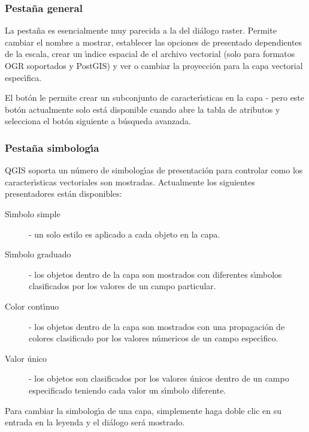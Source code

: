 \subsubsection{Pesta\~na general}\label{vectorgeneraltab}
La pesta\~na  es esencialmente muy parecida a la del di\'alogo raster. Permite
cambiar el nombre a mostrar, establecer las opciones de presentado dependientes de la escala, crear un \'{\i}ndice espacial 
de el archivo vectorial (solo para formatos OGR soportados y PostGIS) y ver o cambiar
la proyecci\'on para la capa vectorial espec\'{\i}fica.

El bot\'on  le permite crear un subconjunto de caracter\'{\i}sticas 
en la capa - pero este bot\'on actualmente solo est\'a disponible cuando abre la tabla  
de atributos y selecciona el bot\'on  siguiente a b\'usqueda avanzada.

\subsubsection{Pesta\~na simbolog\'{\i}a}\label{sec:symbology}

QGIS soporta un n\'umero de simbolog\'{\i}as de presentaci\'on para controlar como
los caracter\'{\i}sticas vectoriales son mostradas. Actualmente los siguientes presentadores
est\'an disponibles:

\begin{description} 
    \item[S\'{\i}mbolo simple] - un solo estilo es aplicado a
    cada objeto en la capa.
    \item[S\'{\i}mbolo graduado] - los objetos dentro de la capa son
    mostrados con diferentes s\'{\i}mbolos clasificados por los valores de un
    campo particular. 
    \item[Color cont\'{\i}nuo] - los objetos dentro de la capa son
    mostrados con una propagaci\'on de colores clasificado por los valores
    n\'umericos de un campo espec\'{\i}fico.
    \item[Valor \'unico] - los objetos son clasificados por los valores \'unicos
    dentro de un campo especificado teniendo cada valor un s\'{\i}mbolo diferente.
\end{description}

Para cambiar la simbolog\'{\i}a de una capa, simplemente haga doble clic en su entrada
en la leyenda y el di\'alogo  ser\'a mostrado.

